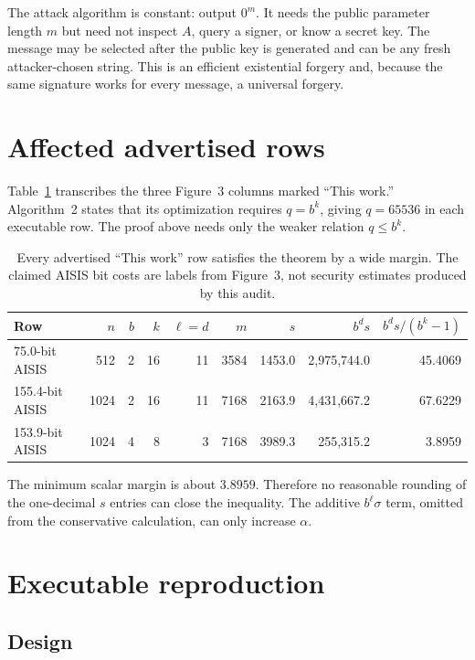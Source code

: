 \documentclass[10pt,a4paper]{article}
\begin{document}
The attack algorithm is constant: output $0^m$. It needs the public parameter
length $m$ but need not inspect $A$, query a signer, or know a secret key. The
message may be selected after the public key is generated and can be any
fresh attacker-chosen string. This is an efficient existential forgery and,
because the same signature works for every message, a universal forgery.

\section{Affected advertised rows}

Table~\ref{tab:rows} transcribes the three Figure~3 columns marked ``This
work.'' Algorithm~2 states that its optimization requires $q=b^k$, giving
$q=65536$ in each executable row. The proof above needs only the weaker
relation $q\leq b^k$.

\begin{table}[ht]
\centering
\small
\begin{tabular}{@{}lrrrrrrrr@{}}
\toprule
Row & $n$ & $b$ & $k$ & $\ell=d$ & $m$ & $s$ & $b^d s$ & $b^d s/(b^k-1)$\\
\midrule
75.0-bit AISIS  & 512  & 2 & 16 & 11 & 3584 & 1453.0 & 2,975,744.0 & 45.4069\\
155.4-bit AISIS & 1024 & 2 & 16 & 11 & 7168 & 2163.9 & 4,431,667.2 & 67.6229\\
153.9-bit AISIS & 1024 & 4 & 8  & 3  & 7168 & 3989.3 & 255,315.2 & 3.8959\\
\bottomrule
\end{tabular}
\caption{Every advertised ``This work'' row satisfies the theorem by a wide
margin. The claimed AISIS bit costs are labels from Figure~3, not security
estimates produced by this audit.}
\label{tab:rows}
\end{table}

The minimum scalar margin is about $3.8959$. Therefore no reasonable rounding
of the one-decimal $s$ entries can close the inequality. The additive
$b^\ell\sigma$ term, omitted from the conservative calculation, can only
increase $\alpha$.

\section{Executable reproduction}

\subsection{Design}
\end{document}

